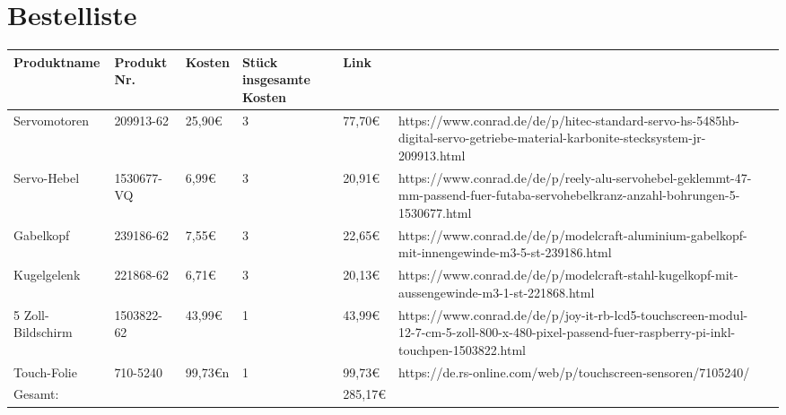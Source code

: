 \documentclass[12pt,a4paper,bibliography=totoc,listof=totoc]{scrartcl}
\begin{document}
\section {Bestelliste}
\begin{tabularx}{\textwidth}{p{}|X|X|X|X|X|X|}
Produktname					& Produkt Nr.			& Kosten				& Stück  insgesamte Kosten &Link \\
\hline
Servomotoren	&209913-62 &25,90€ &3 &77,70€	&https://www.conrad.de/de/p/hitec-standard-servo-hs-5485hb-digital-servo-getriebe-material-karbonite-stecksystem-jr-209913.html \\
\hline
Servo-Hebel &1530677-VQ &6,99€ &3 & 20,91€ &https://www.conrad.de/de/p/reely-alu-servohebel-geklemmt-47-mm-passend-fuer-futaba-servohebelkranz-anzahl-bohrungen-5-1530677.html \\
\hline
Gabelkopf &239186-62 &7,55€ & 3 &22,65€ &https://www.conrad.de/de/p/modelcraft-aluminium-gabelkopf-mit-innengewinde-m3-5-st-239186.html \\
\hline
Kugelgelenk &221868-62 &6,71€ &3 &20,13€ &https://www.conrad.de/de/p/modelcraft-stahl-kugelkopf-mit-aussengewinde-m3-1-st-221868.html \\
\hline
5 Zoll-Bildschirm &1503822-62 &43,99€ &1 &43,99€ &https://www.conrad.de/de/p/joy-it-rb-lcd5-touchscreen-modul-12-7-cm-5-zoll-800-x-480-pixel-passend-fuer-raspberry-pi-inkl-touchpen-1503822.html \\
\hline
Touch-Folie &710-5240 &99,73€n &1 &99,73€ &https://de.rs-online.com/web/p/touchscreen-sensoren/7105240/ \\
\hline
Gesamt: & & & &285,17€ &
\hline
\caption{Tabelle: Bestellliste}
\label{tbl:bestellliste}
\end{tabularx}
\end{document}
